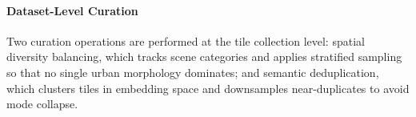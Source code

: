 \paragraph{Dataset-Level Curation}
Two curation operations are performed at the tile collection level: spatial diversity balancing, which tracks scene categories and applies stratified sampling so that no single urban morphology dominates; and semantic deduplication, which clusters tiles in embedding space and downsamples near-duplicates to avoid mode collapse.
